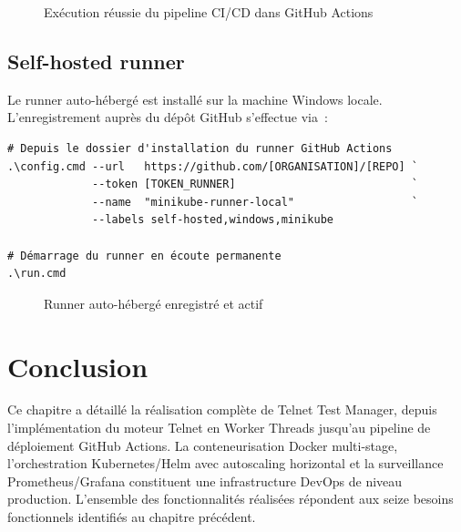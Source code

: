 \begin{figure}[H]
  \centering
  \caption{Exécution réussie du pipeline CI/CD dans GitHub Actions}
  \label{fig:pipeline_github}
\end{figure}

\subsection{Self-hosted runner}

Le runner auto-hébergé est installé sur la machine Windows locale.
L'enregistrement auprès du dépôt GitHub s'effectue via~:

\begin{lstlisting}[language={},
  caption={Commandes d'enregistrement du runner auto-hébergé},
  label={lst:runner_setup}]
# Depuis le dossier d'installation du runner GitHub Actions
.\config.cmd --url   https://github.com/[ORGANISATION]/[REPO] `
             --token [TOKEN_RUNNER]                           `
             --name  "minikube-runner-local"                  `
             --labels self-hosted,windows,minikube

# Démarrage du runner en écoute permanente
.\run.cmd
\end{lstlisting}

\begin{figure}[H]
  \centering
  \caption{Runner auto-hébergé enregistré et actif}
  \label{fig:runner_github}
\end{figure}

\section{Conclusion}

Ce chapitre a détaillé la réalisation complète de Telnet Test Manager,
depuis l'implémentation du moteur Telnet en Worker Threads jusqu'au
pipeline de déploiement GitHub Actions. La conteneurisation Docker
multi-stage, l'orchestration Kubernetes/Helm avec autoscaling horizontal
et la surveillance Prometheus/Grafana constituent une infrastructure
DevOps de niveau production. L'ensemble des fonctionnalités réalisées
répondent aux seize besoins fonctionnels identifiés au chapitre précédent.
